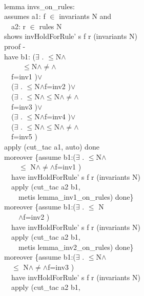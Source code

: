 \begin{specification}
\\
lemma invs\_on\_rules: \\
assumes a1: f $\in$ invariants N  and \\
~~a2: r $\in$ rules N\\
shows invHoldForRule' s f r (invariants N)\\
proof -\\
have b1: ($\exists$  . $\le$N$\wedge$\\
~~~~~$\le$N$\wedge$$\neq$$\wedge$\\
~~f=inv1   )$\vee$\\
~~($\exists$ . $\le$N$\wedge$f=inv2  )$\vee$\\
~~($\exists$  . $\le$N$\wedge$$\le$N$\wedge$$\neq$$\wedge$\\
~~f=inv3   )$\vee$\\
~~($\exists$ . $\le$N$\wedge$f=inv4  )$\vee$\\
~~($\exists$  . $\le$N$\wedge$$\le$N$\wedge$$\neq$$\wedge$\\
~~f=inv5   )\\
apply (cut\_tac a1, auto) done\\
moreover \{assume b1:($\exists$  . $\le$N$\wedge$ \\
~~~~$\le$ N$\wedge$$\neq$$\wedge$f=inv1   )\\
~~have invHoldForRule' s f r (invariants N)\\
~~apply (cut\_tac a2 b1,\\
~~~~metis lemma\_inv1\_on\_rules) done\}\\
moreover \{assume b1:($\exists$ . $\le$ N\\
~~~~$\wedge$f=inv2  )\\
~~have invHoldForRule' s f r (invariants N)\\
~~apply (cut\_tac a2 b1,\\
~~~~metis lemma\_inv2\_on\_rules) done\}\\
moreover \{assume b1:($\exists$  . $\le$N$\wedge$\\
~~$\le$ N$\wedge$$\neq$$\wedge$f=inv3   )\\
~~have invHoldForRule' s f r (invariants N)\\
~~apply (cut\_tac a2 b1,\\

\end{specification}

